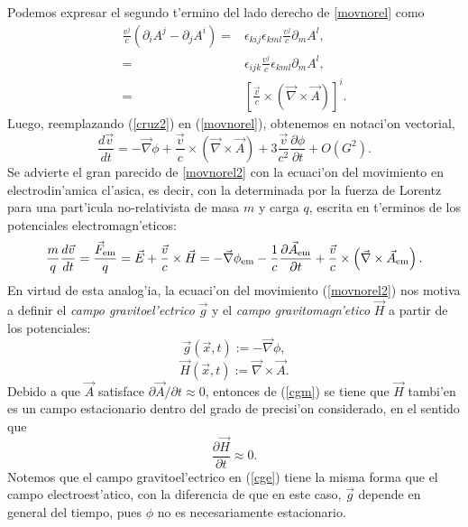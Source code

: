 Podemos expresar el segundo t'ermino del lado derecho de \eqref{movnorel} como
\begin{align}
\frac{v^j}{c}\left( \partial_iA^{j}-\partial_jA^{i}\right)={}&\epsilon_{kij}\epsilon_{kml}\frac{v^j}{c}\partial_m A^{l},\\
={}&\epsilon_{ijk}\frac{v^j}{c}\epsilon_{kml}\partial_m A^{l},\\
={}&\left[ \frac{\vec{v}}{c}\times\left( \vec{\nabla}\times\vec{A}\right) \right]^i.\label{cruz2}
\end{align}
Luego, reemplazando (\ref{cruz2}) en (\ref{movnorel}), obtenemos en notaci'on vectorial,
\begin{equation}
\frac{d\vec{v}}{dt}=-\vec{\nabla}\phi+\frac{\vec{v}}{c}\times\left( \vec{\nabla}\times\vec{A}\right)+3\frac{\vec{v}}{c^2}\frac{\partial \phi}{\partial t}+O\left(G^2\right).\label{movnorel2}
\end{equation}
Se advierte el gran parecido de \eqref{movnorel2} con la ecuaci'on del movimiento en electrodin'amica cl'asica, es decir, con la determinada por la fuerza de Lorentz para una part'icula no-relativista de masa $m$ y carga $q$, escrita en t'erminos de los potenciales electromagn'eticos:
\begin{equation}
\frac{m}{q}\frac{d\vec{v}}{dt}=\frac{\vec{F}_{\rm em}}{q}=\vec{E}+\frac{\vec{v}}{c}\times\vec{H}=-\vec{\nabla}\phi_{\rm em}-\frac{1}{c}\frac{\partial \vec{A}_{\rm em}}{\partial t}+\frac{\vec{v}}{c}\times\left(\vec{\nabla}\times\vec{A}_{\rm em}\right).\label{fuerzalorentz}
\end{equation}
En virtud de esta analog'ia, la ecuaci'on del movimiento (\ref{movnorel2}) nos motiva a definir el \textit{campo gravitoel'ectrico} $\vec{g}$ y el \textit{campo gravitomagn'etico} $\vec{H}$ a partir de los potenciales:
\begin{equation}\boxed{
\vec{g}(\vec{x},t):=-\vec{\nabla}\phi,}\label{cge}
\end{equation}
\begin{equation}\boxed{
\vec{H}(\vec{x},t):=\vec{\nabla}\times\vec{A}.}\label{cgm}
\end{equation}
Debido a que $\vec{A}$ satisface $\partial \vec{A}/\partial t\approx 0$, entonces de (\ref{cgm}) se tiene que $\vec{H}$ tambi'en es un campo estacionario dentro del grado de precisi'on considerado, en el sentido que
\begin{equation}
\frac{\partial \vec{H}}{\partial t}\approx 0.
\end{equation}
Notemos que el campo gravitoel'ectrico en (\ref{cge}) tiene la misma forma que el campo electroest'atico,
con la diferencia de que en este caso, $\vec{g}$ depende en general del tiempo, pues $\phi$ no es necesariamente estacionario.

